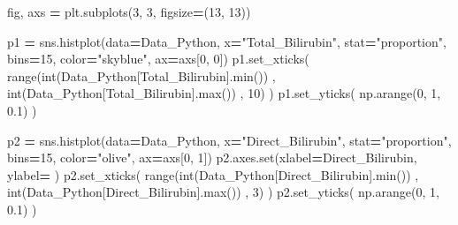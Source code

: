 \documentclass[
  11pt,
  a4paper,
]{article}
\newenvironment{Shaded}{\begin{snugshade}}{\end{snugshade}}
\newcommand{\BuiltInTok}[1]{#1}
\newcommand{\DecValTok}[1]{\textcolor[rgb]{0.00,0.00,0.81}{#1}}
\newcommand{\FloatTok}[1]{\textcolor[rgb]{0.00,0.00,0.81}{#1}}
\newcommand{\NormalTok}[1]{#1}
\newcommand{\OperatorTok}[1]{\textcolor[rgb]{0.81,0.36,0.00}{\textbf{#1}}}
\newcommand{\StringTok}[1]{\textcolor[rgb]{0.31,0.60,0.02}{#1}}
\begin{document}
\begin{Shaded}
\begin{Highlighting}[]
\NormalTok{fig, axs }\OperatorTok{=}\NormalTok{ plt.subplots(}\DecValTok{3}\NormalTok{, }\DecValTok{3}\NormalTok{, figsize}\OperatorTok{=}\NormalTok{(}\DecValTok{13}\NormalTok{, }\DecValTok{13}\NormalTok{))}

\NormalTok{p1 }\OperatorTok{=}\NormalTok{ sns.histplot(data}\OperatorTok{=}\NormalTok{Data\_Python, x}\OperatorTok{=}\StringTok{"Total\_Bilirubin"}\NormalTok{, stat}\OperatorTok{=}\StringTok{"proportion"}\NormalTok{, bins}\OperatorTok{=}\DecValTok{15}\NormalTok{, color}\OperatorTok{=}\StringTok{"skyblue"}\NormalTok{, ax}\OperatorTok{=}\NormalTok{axs[}\DecValTok{0}\NormalTok{, }\DecValTok{0}\NormalTok{])}
\NormalTok{p1.set\_xticks( }\BuiltInTok{range}\NormalTok{(}\BuiltInTok{int}\NormalTok{(Data\_Python[}\StringTok{\textquotesingle{}Total\_Bilirubin\textquotesingle{}}\NormalTok{].}\BuiltInTok{min}\NormalTok{()) , }\BuiltInTok{int}\NormalTok{(Data\_Python[}\StringTok{\textquotesingle{}Total\_Bilirubin\textquotesingle{}}\NormalTok{].}\BuiltInTok{max}\NormalTok{()) , }\DecValTok{10}\NormalTok{) )}
\NormalTok{p1.set\_yticks( np.arange(}\DecValTok{0}\NormalTok{, }\DecValTok{1}\NormalTok{, }\FloatTok{0.1}\NormalTok{)  )}

\NormalTok{p2 }\OperatorTok{=}\NormalTok{ sns.histplot(data}\OperatorTok{=}\NormalTok{Data\_Python, x}\OperatorTok{=}\StringTok{"Direct\_Bilirubin"}\NormalTok{, stat}\OperatorTok{=}\StringTok{"proportion"}\NormalTok{, bins}\OperatorTok{=}\DecValTok{15}\NormalTok{, color}\OperatorTok{=}\StringTok{"olive"}\NormalTok{, ax}\OperatorTok{=}\NormalTok{axs[}\DecValTok{0}\NormalTok{, }\DecValTok{1}\NormalTok{])}
\NormalTok{p2.axes.}\BuiltInTok{set}\NormalTok{(xlabel}\OperatorTok{=}\StringTok{\textquotesingle{}Direct\_Bilirubin\textquotesingle{}}\NormalTok{, ylabel}\OperatorTok{=}\StringTok{\textquotesingle{} \textquotesingle{}}\NormalTok{)}
\NormalTok{p2.set\_xticks( }\BuiltInTok{range}\NormalTok{(}\BuiltInTok{int}\NormalTok{(Data\_Python[}\StringTok{\textquotesingle{}Direct\_Bilirubin\textquotesingle{}}\NormalTok{].}\BuiltInTok{min}\NormalTok{()) , }\BuiltInTok{int}\NormalTok{(Data\_Python[}\StringTok{\textquotesingle{}Direct\_Bilirubin\textquotesingle{}}\NormalTok{].}\BuiltInTok{max}\NormalTok{()) , }\DecValTok{3}\NormalTok{) )}
\NormalTok{p2.set\_yticks( np.arange(}\DecValTok{0}\NormalTok{, }\DecValTok{1}\NormalTok{, }\FloatTok{0.1}\NormalTok{)  )}


\end{Highlighting}
\end{Shaded}
\end{document}
